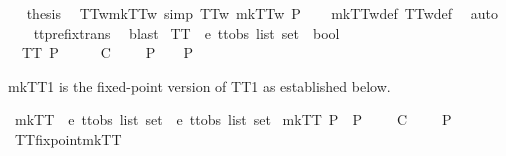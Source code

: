 \ \isamarkupfalse%
\ {\isacharquery}thesis\ \isacommand{{\isachardot}}\isamarkupfalse%
\isanewline
{}\isamarkupfalse%
%
\endisatagproof
{\isafoldproof}%
%
\isadelimproof
\isanewline
%
\endisadelimproof
\isanewline
{}\isamarkupfalse%
\ TT{}w{\isacharunderscore}mkTT{}w\ {\isacharbrackleft}simp{\isacharbrackright}{\isacharcolon}\ {\isachardoublequoteopen}TT{}w\ {\isacharparenleft}mkTT{}w\ P{\isacharparenright}{\isachardoublequoteclose}\isanewline
%
\isadelimproof
\ \ %
\endisadelimproof
%
\isatagproof
{}\isamarkupfalse%
\ mkTT{}w{\isacharunderscore}def\ TT{}w{\isacharunderscore}def\ \isamarkupfalse%
\ auto\isanewline
\ \ \isamarkupfalse%
\ tt{\isacharunderscore}prefix{\isacharunderscore}trans\ \isamarkupfalse%
\ blast%
\endisatagproof
{\isafoldproof}%
%
\isadelimproof
\isanewline
%
\endisadelimproof
\isanewline
{}\isamarkupfalse%
\ TT{}\ {\isacharcolon}{\isacharcolon}\ {\isachardoublequoteopen}{\isacharprime}e\ ttobs\ list\ set\ {\isasymRightarrow}\ bool{\isachardoublequoteclose}\ \isanewline
\ \ {\isachardoublequoteopen}TT{}\ P\ {\isacharequal}\ {\isacharparenleft}{\isasymforall}\ {\isasymrho}\ {\isasymsigma}{\isachardot}\ {\isacharparenleft}{\isasymrho}\ {\isasymlesssim}\isactrlsub C\ {\isasymsigma}\ {\isasymand}\ {\isasymsigma}\ {\isasymin}\ P{\isacharparenright}\ {\isasymlongrightarrow}\ {\isasymrho}\ {\isasymin}\ P{\isacharparenright}{\isachardoublequoteclose}%
\begin{isamarkuptext}%
mkTT1 is the fixed-point version of TT1 as established below.%
\end{isamarkuptext}\isamarkuptrue%
\isamarkupfalse%
\ mkTT{}\ {\isacharcolon}{\isacharcolon}\ {\isachardoublequoteopen}{\isacharprime}e\ ttobs\ list\ set\ {\isasymRightarrow}\ {\isacharprime}e\ ttobs\ list\ set{\isachardoublequoteclose}\ \isanewline
{\isachardoublequoteopen}mkTT{}\ P\ {\isacharequal}\ P\ {\isasymunion}\ {\isacharbraceleft}{\isasymrho}{\isacharbar}{\isasymrho}\ {\isasymsigma}{\isachardot}\ {\isasymrho}\ {\isasymlesssim}\isactrlsub C\ {\isasymsigma}\ {\isasymand}\ {\isasymsigma}\ {\isasymin}\ P{\isacharbraceright}{\isachardoublequoteclose}\isanewline
\isanewline
{}\isamarkupfalse%
\ TT{}{\isacharunderscore}fixpoint{\isacharunderscore}mkTT{}{\isacharcolon}\isanewline
